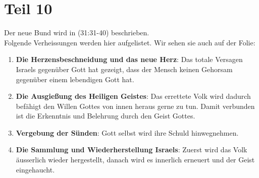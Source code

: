 \section{Teil 10}

\begin{otsblock}[Einführung]    
    Der neue Bund wird in (31:31-40) beschrieben.\\    
    Folgende Verheissungen werden hier aufgelistet. Wir sehen sie auch auf der Folie:
    \begin{enumerate}
        \item \textbf{Die Herzensbeschneidung und das neue Herz}: Das totale Versagen Israels gegenüber Gott hat gezeigt, dass der Mensch keinen Gehorsam gegenüber einem lebendigen Gott hat.         
        \item \textbf{Die Ausgießung des Heiligen Geistes}: Das errettete Volk wird dadurch befähigt den Willen Gottes von innen heraus gerne zu tun. Damit verbunden ist die Erkenntnis und Belehrung durch den Geist Gottes.   
        \item \textbf{Vergebung der Sünden}: Gott selbst wird ihre Schuld hinwegnehmen.         
        \item \textbf{Die Sammlung und Wiederherstellung Israels}:  Zuerst wird das Volk äusserlich wieder hergestellt, danach wird es innerlich erneuert und der Geist eingehaucht.        
    \end{enumerate}
\end{otsblock}

